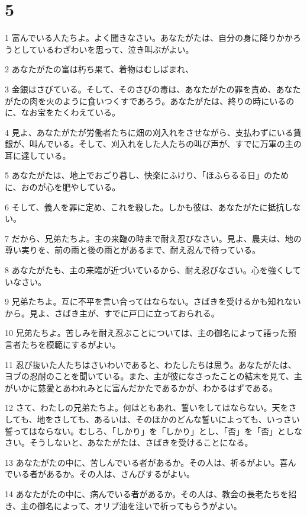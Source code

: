 \chapter{5}

\par 1 富んでいる人たちよ。よく聞きなさい。あなたがたは、自分の身に降りかかろうとしているわざわいを思って、泣き叫ぶがよい。
\par 2 あなたがたの富は朽ち果て、着物はむしばまれ、
\par 3 金銀はさびている。そして、そのさびの毒は、あなたがたの罪を責め、あなたがたの肉を火のように食いつくすであろう。あなたがたは、終りの時にいるのに、なお宝をたくわえている。
\par 4 見よ、あなたがたが労働者たちに畑の刈入れをさせながら、支払わずにいる賃銀が、叫んでいる。そして、刈入れをした人たちの叫び声が、すでに万軍の主の耳に達している。
\par 5 あなたがたは、地上でおごり暮し、快楽にふけり、「ほふらるる日」のために、おのが心を肥やしている。
\par 6 そして、義人を罪に定め、これを殺した。しかも彼は、あなたがたに抵抗しない。
\par 7 だから、兄弟たちよ。主の来臨の時まで耐え忍びなさい。見よ、農夫は、地の尊い実りを、前の雨と後の雨とがあるまで、耐え忍んで待っている。
\par 8 あなたがたも、主の来臨が近づいているから、耐え忍びなさい。心を強くしていなさい。
\par 9 兄弟たちよ。互に不平を言い合ってはならない。さばきを受けるかも知れないから。見よ、さばき主が、すでに戸口に立っておられる。
\par 10 兄弟たちよ。苦しみを耐え忍ぶことについては、主の御名によって語った預言者たちを模範にするがよい。
\par 11 忍び抜いた人たちはさいわいであると、わたしたちは思う。あなたがたは、ヨブの忍耐のことを聞いている。また、主が彼になさったことの結末を見て、主がいかに慈愛とあわれみとに富んだかたであるかが、わかるはずである。
\par 12 さて、わたしの兄弟たちよ。何はともあれ、誓いをしてはならない。天をさしても、地をさしても、あるいは、そのほかのどんな誓いによっても、いっさい誓ってはならない。むしろ、「しかり」を「しかり」とし、「否」を「否」としなさい。そうしないと、あなたがたは、さばきを受けることになる。
\par 13 あなたがたの中に、苦しんでいる者があるか。その人は、祈るがよい。喜んでいる者があるか。その人は、さんびするがよい。
\par 14 あなたがたの中に、病んでいる者があるか。その人は、教会の長老たちを招き、主の御名によって、オリブ油を注いで祈ってもらうがよい。
